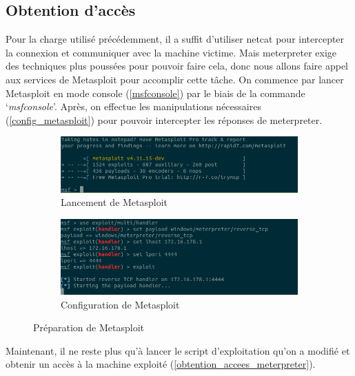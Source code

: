     \subsection{Obtention d'accès}
    Pour la charge utilisé précédemment, il a suffit d'utiliser netcat pour intercepter la connexion et communiquer
    avec la machine victime. Mais meterpreter exige des techniques plus poussées pour pouvoir faire cela, 
    donc nous allons faire appel aux services de Metasploit pour accomplir cette tâche.
    On commence par lancer Metasploit en mode console (\autoref{msfconsole}) par le biais de la commande 
    `\emph{msfconsole}'. Après, on effectue les manipulations nécessaires (\autoref{config_metasploit})
    pour pouvoir intercepter les réponses de meterpreter.

    \begin{figure}[H]
        \centering
        \begin{subfigure}{0.9\textwidth}
            \centering
            \includegraphics[width=\textwidth]{images/msfconsole.png}
            \caption{Lancement de Metasploit}
            \label{msfconsole}
        \end{subfigure}
        \hfill
        \begin{subfigure}{0.9\textwidth}
            \centering
            \includegraphics[width=\textwidth]{images/ecoute_msf.png}
            \caption{Configuration de Metasploit}
            \label{config_metasploit}
        \end{subfigure}
        \hfill
        \caption{Préparation de Metasploit}
        \label{prepration_metasploit}
    \end{figure}

    Maintenant, il ne reste plus qu'à lancer le script d'exploitation qu'on a modifié et obtenir un accès à la 
    machine exploité (\autoref{obtention_accees_meterpreter}).

